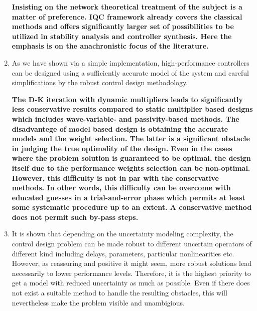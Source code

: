 \begin{enumerate}
    {\bfseries Insisting on the network theoretical treatment of the subject is a matter of preference. IQC framework already covers the 
    classical methods and offers significantly larger set of possibilities to be utilized in stability analysis and controller synthesis. Here 
    the emphasis is on the anachronistic focus of the literature. 
    }
    \item As we have shown via a simple implementation, high-performance controllers can be designed using a sufficiently accurate model of
    the system and careful simplifications by the robust control design methodology. 
    
    {\bfseries The D-K iteration with dynamic multipliers leads to significantly less conservative results compared to static multiplier 
    based designs which includes wave-variable- and passivity-based methods. The disadvantege of model based design is obtaining the accurate
    models and the weight selection. The latter is a significant obstacle in judging the true optimality of the design. Even in the cases 
    where the problem solution is guaranteed to be optimal, the design itself due to the performance weights selection can be non-optimal. 
    However, this difficulty is not in par with the conservative methods. In other words, this difficulty can be overcome with educated 
    guesses in a trial-and-error phase which permits at least some systematic procedure up to an extent. A conservative method does not 
    permit such by-pass steps.
    }
    \item It is shown that depending on the uncertainty modeling complexity, the control design problem can be made robust to different 
    uncertain operators of different kind including delays, parameters, particular nonlinearities etc. However, as reassuring and positive 
    it might seem, more robust solutions lead necessarily to lower performance levels. Therefore, it is the highest priority to get a 
    model with reduced uncertainty as much as possible. Even if there does not exist a suitable method to handle the resulting obstacles, 
    this will nevertheless make the problem visible and unambigious. 
    

\end{enumerate}
